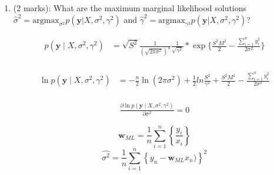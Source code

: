 \documentclass[11pt]{article}
\newcommand{\mbf}[1]{{\boldsymbol{\mathbf{#1}}}}
\renewcommand{\bm}{\mbf}
\begin{document}
\begin{enumerate}
\begin{enumerate}[label=(\alph*)]




\item (2 marks): What are the maximum marginal likelihood solutions $\hat{\sigma}^2 =  \text{argmax}_{\sigma^2} p(\bm{y} | X, \sigma^2, \gamma^2)$ and 
$\hat{\gamma}^2 =  \text{argmax}_{\gamma^2} p(\bm{y} | X, \sigma^2, \gamma^2)$?

$$
\begin{aligned}
p(\mathbf{y} \mid X, \sigma^2, \gamma^2)
&= \sqrt{ S^2} \frac{1}{(\sqrt{2\pi \sigma^2})^n} \frac{1}{\sqrt{\gamma^2}} * \exp \{\frac{S^2M^2}{2} - \frac{\sum_{i=1}^{n}{y_i^2}}{2\sigma^2}\} \\
\end{aligned}
$$

$$
\begin{aligned}
\ln p(\mathbf{y} \mid X, \sigma^2, \gamma^2)
&= - \frac{n}{2} \ln(2\pi \sigma^2) + \frac{1}{2} ln \frac{S^2}{\gamma^2} + \frac{S^2M^2}{2} - \frac{\sum_{i=1}^{n}{y_i^2}}{2\sigma^2} \\
\end{aligned}
$$

$$
\begin{aligned}
\frac{\partial{\ln p(\mathbf{y} \mid X, \sigma^2, \gamma^2)}}{\partial{\sigma^2}} = 0
\end{aligned}
$$



$$
\mathbf{w}_{M L} = \frac{1}{n}\sum_{i=1}^{n}\left\{ \frac{y_i}{x_i} \right\}
$$
$$
\hat{\sigma^2}=\frac{1}{n} \sum_{i=1}^{n}\left\{y_{n}-\mathbf{w}_{M L} x_{n})\right\}^{2}
$$





\end{enumerate}
\end{enumerate}
\end{document}

